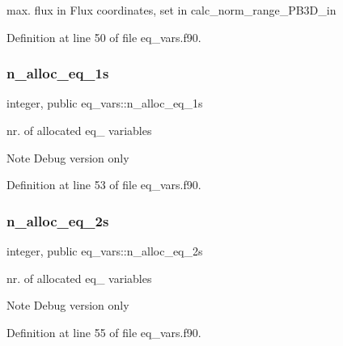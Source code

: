 max. flux in Flux coordinates, set in calc\+\_\+norm\+\_\+range\+\_\+\+P\+B3\+D\+\_\+in 



Definition at line 50 of file eq\+\_\+vars.\+f90.

\mbox{\label{namespaceeq__vars_aed1853ac20f0da0be39ab8ef82993c4d}} 
\subsubsection{\texorpdfstring{n\+\_\+alloc\+\_\+eq\+\_\+1s}{n\_alloc\_eq\_1s}}
{\footnotesize\ttfamily integer, public eq\+\_\+vars\+::n\+\_\+alloc\+\_\+eq\+\_\+1s}



nr. of allocated {\ttfamily eq\+\_} variables 

\begin{DoxyNote}{Note}
Debug version only 
\end{DoxyNote}


Definition at line 53 of file eq\+\_\+vars.\+f90.

\mbox{\label{namespaceeq__vars_af75297445b32de13371da989074dd454}} 
\subsubsection{\texorpdfstring{n\+\_\+alloc\+\_\+eq\+\_\+2s}{n\_alloc\_eq\_2s}}
{\footnotesize\ttfamily integer, public eq\+\_\+vars\+::n\+\_\+alloc\+\_\+eq\+\_\+2s}



nr. of allocated {\ttfamily eq\+\_} variables 

\begin{DoxyNote}{Note}
Debug version only 
\end{DoxyNote}


Definition at line 55 of file eq\+\_\+vars.\+f90.

\mbox{\label{namespaceeq__vars_abce8bbe23c333a591a2ee5cef9512de9}} 
